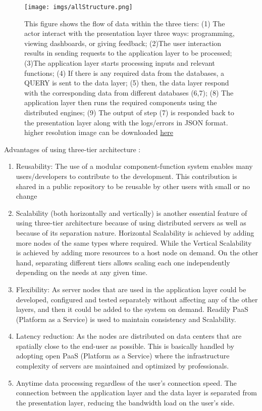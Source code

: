 \documentclass{scsSimAUDPaperFormat}
\begin{document}
\begin{figure}[ht]
\centering
\texttt{[image: imgs/allStructure.png]}
\caption{This figure shows the flow of data within the three tiers: (1) The actor interact with the presentation layer three ways: programming, viewing dashboards, or giving feedback; (2)The user interaction results in sending requests to the application layer to be processed; (3)The application layer starts processing inputs and relevant functions; (4) If there is any required data from the databases, a QUERY is sent to the data layer; (5) then, the data layer respond with the corresponding data from different databases (6,7); (8) The application layer then runs the required components using the distributed engines; (9) The output of step (7) is responded back to the presentation layer along with the logs/errors in JSON format. higher resolution image can be downloaded \href{https://user-images.githubusercontent.com/6969514/72152397-cee71700-33e5-11ea-9108-c6823d2be504.png}{here}
}
\label{fig:structure}
\end{figure}

Advantages of using three-tier architecture \cite{Furht2010HandbookComputing}:
\begin{enumerate}
    \item Reusability: The use of a modular component-function system enables many users/developers to contribute to the development. This contribution is shared in a public repository to be reusable by other users with small or no change
    \item Scalability (both horizontally and vertically) is another essential feature of using three-tier architecture because of using distributed servers as well as because of its separation nature. Horizontal Scalability is achieved by adding more nodes of the same types where required. While the Vertical Scalability is achieved by adding more resources to a host node on demand. On the other hand, separating different tiers allows scaling each one independently depending on the needs at any given time. 
    \item Flexibility: As server nodes that are used in the application layer could be developed, configured and tested separately without affecting any of the other layers, and then it could be added to the system on demand. Readily PaaS (Platform as a Service) is used to maintain consistency and Scalability. 
    \item Latency reduction: As the nodes are distributed on data centers that are spatially close to the end-user as possible. This is basically handled by adopting open PaaS (Platform as a Service) where the infrastructure complexity of servers are maintained and optimized by professionals. 
    \item Anytime data processing regardless of the user's connection speed. The connection between the application layer and the data layer is separated from the presentation layer, reducing the bandwidth load on the user's side.
    
\end{enumerate}
\end{document}
